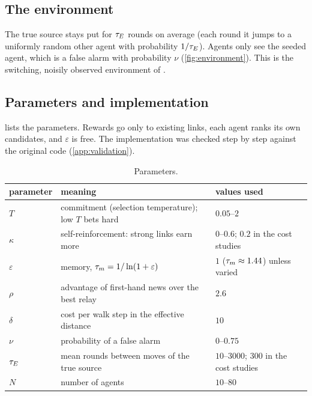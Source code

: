 \subsection{The environment}
The true source stays put for $\tau_E$ rounds on average (each round it jumps to a uniformly random other agent with
probability $1/\tau_E$). Agents only see the seeded agent, which is a false alarm with probability $\nu$
(\cref{fig:environment}). This is the switching, noisily observed environment of \citet{lee2024constructing}.


\subsection{Parameters and implementation}
 lists the parameters. Rewards go only to existing links, each agent ranks its own candidates, and
$\varepsilon$ is free. The implementation was checked step by step against the original code (\cref{app:validation}).

\begin{table}[tbp]\centering\small
\caption{Parameters.}\label{tab:params}
\begin{tabular}{lll}\toprule
parameter & meaning & values used\\\midrule
$T$ & commitment (selection temperature); low $T$ bets hard & $0.05$--$2$\\
$\kappa$ & self-reinforcement: strong links earn more & $0$--$0.6$; $0.2$ in the cost studies\\
$\varepsilon$ & memory, $\tau_m=1/\ln(1+\varepsilon)$ & $1$ ($\tau_m\approx1.44$) unless varied\\
$\rho$ & advantage of first-hand news over the best relay & $2.6$\\
$\delta$ & cost per walk step in the effective distance & $10$\\
$\nu$ & probability of a false alarm & $0$--$0.75$\\
$\tau_E$ & mean rounds between moves of the true source & $10$--$3000$; $300$ in the cost studies\\
$N$ & number of agents & $10$--$80$\\\bottomrule
\end{tabular}\end{table}

